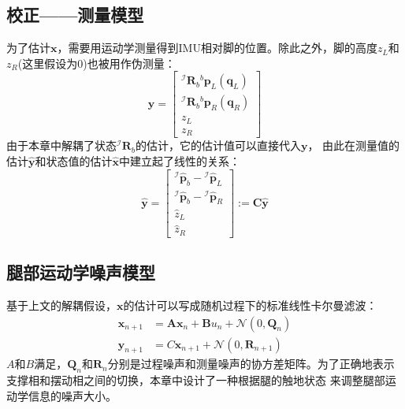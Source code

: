 \subsection{校正——测量模型}
为了估计$\boldsymbol{x}$，需要用运动学测量得到IMU相对脚的位置。除此之外，脚的高度$z_L$和$z_R$(这里假设为0)也被用作伪测量：
\begin{equation}
    \label{equ:est_posvel_mea}
    \boldsymbol{y}=\left[\begin{array}{c}
        { }^{\mathcal{I}} \boldsymbol{R}_b{ }^b \boldsymbol{p}_L\left(\boldsymbol{q}_L\right) \\
        { }^{\mathcal{I}} \boldsymbol{R}_b{ }^b \boldsymbol{p}_R\left(\boldsymbol{q}_R\right) \\
        z_L \\
        z_R
        \end{array}\right]
\end{equation}
由于本章中解耦了状态${ }^{\mathcal{I}} \boldsymbol{R}_{b}$的估计，它的估计值可以直接代入$\boldsymbol{y}$，
由此在测量值的估计$\hat{\boldsymbol{y}}$和状态值的估计$\hat{\boldsymbol{x}}$中建立起了线性的关系：
\begin{equation}
    \label{equ:est_mea_model}
    \hat{\boldsymbol{y}}=\left[\begin{array}{c}
        { }^{\mathcal{I}} \hat{\boldsymbol{p}}_b-{ }^{\mathcal{I}} \hat{\boldsymbol{p}}_L \\
        { }^{\mathcal{I}} \hat{\boldsymbol{p}}_b-{ }^{\mathcal{I}} \hat{\boldsymbol{p}}_R \\
        \hat{z}_L \\
        \hat{z}_R
        \end{array}\right]:=\boldsymbol{C} \hat{\boldsymbol{y}}
\end{equation}
\subsection{腿部运动学噪声模型}
\label{sec:leg_noise}
基于上文的解耦假设，$\boldsymbol{x}$的估计可以写成随机过程下的标准线性卡尔曼滤波：
\begin{equation}
    \label{equ:std_kf}
    \begin{aligned}
        \boldsymbol{x}_{n+1} & =\boldsymbol{A} \boldsymbol{x}_n+\boldsymbol{B} u_n+\mathcal{N}\left(0, \boldsymbol{Q}_n\right) \\
        \boldsymbol{y}_{n+1} & =C \boldsymbol{x}_{n+1}+\mathcal{N}\left(0, \boldsymbol{R}_{n+1}\right)
        \end{aligned}
\end{equation}
$A$和$B$满足，$\boldsymbol{Q}_n$和$\boldsymbol{R}_n$分别是过程噪声和测量噪声的协方差矩阵。为了正确地表示支撑相和摆动相之间的切换，本章中设计了一种根据腿的触地状态
来调整腿部运动学信息的噪声大小。

